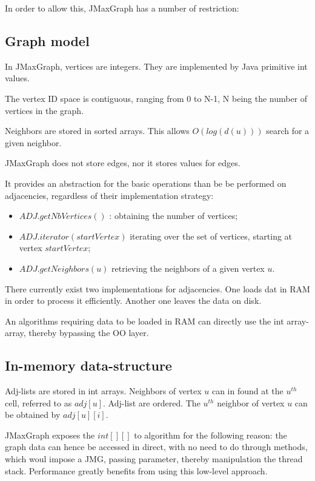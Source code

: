 \documentclass[11pt,a4paper]{article}
\begin{document}
In order to allow this, JMaxGraph has a number of  restriction:



\subsection{Graph model}

In JMaxGraph, vertices are integers. They are implemented by Java primitive int values.

The vertex ID space is contiguous, ranging from 0 to N-1, N being the number of vertices in the graph.

Neighbors are stored in sorted arrays.
This allows $O(log(d(u)))$ search for a given neighbor.

JMaxGraph does not store edges, nor it stores values for edges.

It provides an abstraction for the basic operations than be be performed on adjacencies, regardless of their implementation strategy:
\begin{itemize}
\item $ADJ.getNbVertices()$ : obtaining the number of vertices;
\item $ADJ.iterator(startVertex)$ iterating over the set of vertices, starting at vertex $startVertex$;
\item $ADJ.getNeighbors(u)$ retrieving the neighbors of a given vertex $u$.
\end{itemize}

There currently exist two implementations for adjacencies. One loads dat  in RAM in order to process it efficiently. Another one leaves the data on disk.

An algorithms requiring data to be loaded in RAM can directly use the int array-array, thereby bypassing the OO layer.


\subsection{In-memory data-structure}

Adj-lists are stored in int arrays. Neighbors of vertex $u$ can in found at the $u^{th}$ cell, referred to as $adj[u]$.
Adj-list are ordered. The $u^{th}$ neighbor of vertex $u$ can be obtained by $adj[u][i]$.


JMaxGraph exposes the $int[][]$ to algorithm for the following reason: the graph data can hence be accessed in direct, with no need to do through methods, which woul impose a JMG, passing parameter, thereby manipulation the thread stack. Performance greatly benefits from using this low-level approach.
\end{document}
